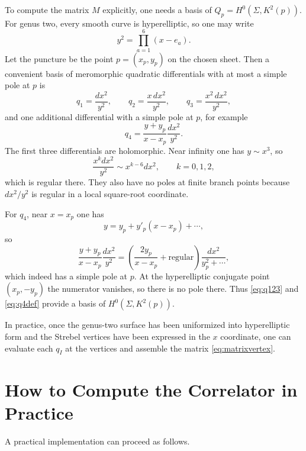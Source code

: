 \documentclass[12pt]{article}
\begin{document}
To compute the matrix $M$ explicitly, one needs a basis of $Q_p=H^0(\Sigma,K^2(p))$. For genus two, every smooth curve is hyperelliptic, so one may write
\begin{equation}
y^2 = \prod_{a=1}^6 (x-e_a).
\end{equation}
Let the puncture be the point $p=(x_p,y_p)$ on the chosen sheet. Then a convenient basis of meromorphic quadratic differentials with at most a simple pole at $p$ is
\begin{equation}
q_1 = \frac{dx^2}{y^2},
\qquad
q_2 = \frac{x\,dx^2}{y^2},
\qquad
q_3 = \frac{x^2\,dx^2}{y^2},
\label{eq:q123}
\end{equation}
and one additional differential with a simple pole at $p$, for example
\begin{equation}
q_4 = \frac{y+y_p}{x-x_p}\frac{dx^2}{y^2}.
\label{eq:q4def}
\end{equation}
The first three differentials are holomorphic. Near infinity one has $y\sim x^3$, so
\begin{equation}
\frac{x^k dx^2}{y^2} \sim x^{k-6}dx^2,
\qquad k=0,1,2,
\end{equation}
which is regular there. They also have no poles at finite branch points because $dx^2/y^2$ is regular in a local square-root coordinate.

For $q_4$, near $x=x_p$ one has
\begin{equation}
y = y_p + y'_p(x-x_p)+\cdots,
\end{equation}
so
\begin{equation}
\frac{y+y_p}{x-x_p}\frac{dx^2}{y^2}
= \left(\frac{2y_p}{x-x_p}+\text{regular}\right)\frac{dx^2}{y_p^2+\cdots},
\end{equation}
which indeed has a simple pole at $p$. At the hyperelliptic conjugate point $(x_p,-y_p)$ the numerator vanishes, so there is no pole there. Thus \eqref{eq:q123} and \eqref{eq:q4def} provide a basis of $H^0(\Sigma,K^2(p))$.

In practice, once the genus-two surface has been uniformized into hyperelliptic form and the Strebel vertices have been expressed in the $x$ coordinate, one can evaluate each $q_I$ at the vertices and assemble the matrix \eqref{eq:matrixvertex}.

\section{How to Compute the Correlator in Practice}

A practical implementation can proceed as follows.
\end{document}
